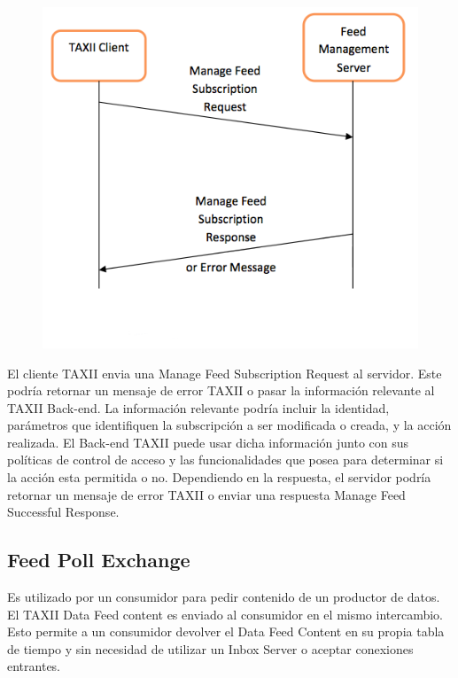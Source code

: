 \begin{figure}[ht!]
  \centering
    \includegraphics[width=150mm]{./Figures/SubscriptionManagmentExchange.png}
\end{figure}

El cliente TAXII envia una Manage Feed Subscription Request al servidor. Este 
podría retornar un mensaje de error TAXII o pasar la información relevante al 
TAXII Back-end. La información relevante podría incluir la identidad, parámetros 
que identifiquen la subscripción a ser modificada o creada, y la acción 
realizada. El Back-end TAXII puede usar dicha información junto con sus 
políticas de control de acceso y las funcionalidades que posea para determinar 
si la acción esta permitida o no. Dependiendo en la respuesta, el servidor 
podría retornar un mensaje de error TAXII o enviar una respuesta Manage Feed 
Successful Response.

\subsection{Feed Poll Exchange}

Es utilizado por un consumidor para pedir contenido de un productor de datos. El 
TAXII Data Feed content es enviado al consumidor en el mismo intercambio. Esto  
permite a un consumidor devolver el Data Feed Content en su propia tabla de 
tiempo y sin necesidad de utilizar un Inbox Server o aceptar conexiones 
entrantes.

